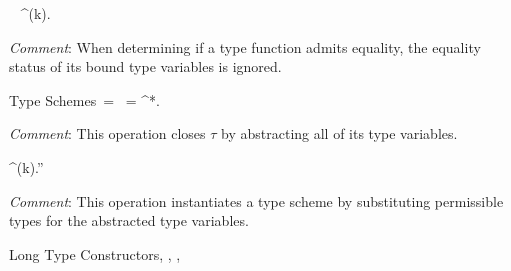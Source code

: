 \begin{relation}{}{\theta ~ }
	{\Lambda\alpha^{(k)}.\tau ~ }
\end{relation}

\par\noindent\emph{Comment}: When determining if a type function admits equality,
the equality status of its bound type variables is ignored.

\begin{relation}{Type Schemes}{~\tau = \sigma}
	{~\tau = \forall\alpha^{*}.\tau}
\end{relation}

\par\noindent\emph{Comment}: This operation closes $\tau$ by
abstracting all of its type variables.

\begin{relation}{}{\alpha\succ\tau}
	{\alpha \succ \tau}
\rruleskip
{}
	{\alpha \succ \tau}
\end{relation}

\begin{relation}{}{\sigma\succ\tau}
	{\forall\alpha^{(k)}.\tau\succ\tau''}
\end{relation}

\par\noindent\emph{Comment}: This operation instantiates a type scheme
by substituting permissible types for the abstracted type variables.

\begin{relation}{Long Type Constructors}{\ME,\TE\vdash{}\Rightarrow\theta}
	{\ME,\TE \vdash {} \Rightarrow \theta}
\rruleskip
{}
	{\ME,\TE \vdash {} \Rightarrow \theta}
\end{relation}

